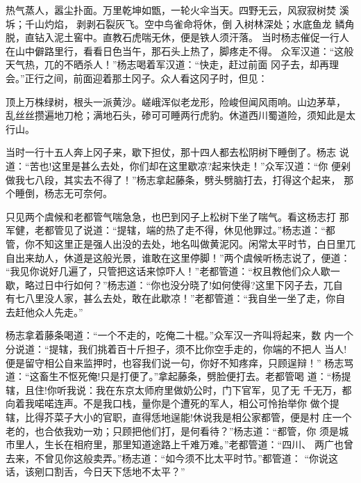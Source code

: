 热气蒸人，嚣尘扑面。万里乾坤如甑，一轮火伞当天。四野无云，风寂寂树焚
溪坼；千山灼焰，剥剥石裂灰飞。空中鸟雀命将休，倒入树林深处；水底鱼龙
鳞角脱，直钻入泥土窖中。直教石虎喘无休，便是铁人须汗落。
当时杨志催促一行人在山中僻路里行，看看日色当午，那石头上热了，脚疼走不得。
众军汉道：“这般天气热，兀的不晒杀人！”杨志喝着军汉道：“快走，赶过前面
冈子去，却再理会。”正行之间，前面迎着那土冈子。众人看这冈子时，但见：

顶上万株绿树，根头一派黄沙。嵯峨浑似老龙形，险峻但闻风雨响。山边茅草，
乱丝丝攒遍地刀枪；满地石头，碜可可睡两行虎豹。休道西川蜀道险，须知此是太
行山。

当时一行十五人奔上冈子来，歇下担仗，那十四人都去松阴树下睡倒了。杨志
说道：“苦也!这里是甚么去处，你们却在这里歇凉?起来快走！”众军汉道：“你
便剁做我七八段，其实去不得了！”杨志拿起藤条，劈头劈脑打去，打得这个起来，
那个睡倒，杨志无可奈何。

只见两个虞候和老都管气喘急急，也巴到冈子上松树下坐了喘气。看这杨志打
那军健，老都管见了说道：“提辖，端的热了走不得，休见他罪过。”杨志道：“都
管，你不知这里正是强人出没的去处，地名叫做黄泥冈。闲常太平时节，白日里兀
自出来劫人，休道是这般光景，谁敢在这里停脚！”两个虞候听杨志说了，便道：
“我见你说好几遍了，只管把这话来惊吓人！”老都管道：“权且教他们众人歇一
歇，略过日中行如何？”杨志道：“你也没分晓了!如何使得?这里下冈子去，兀自
有七八里没人家，甚么去处，敢在此歇凉！”老都管道：“我自坐一坐了走，你自
去赶他众人先走。”

杨志拿着藤条喝道：“一个不走的，吃俺二十棍。”众军汉一齐叫将起来，数
内一个分说道：“提辖，我们挑着百十斤担子，须不比你空手走的，你端的不把人
当人!便是留守相公自来监押时，也容我们说一句，你好不知疼痒，只顾逞辩！”
杨志骂道：“这畜生不怄死俺!只是打便了。”拿起藤条，劈脸便打去。老都管喝
道：“杨提辖，且住!你听我说：我在东京太师府里做奶公时，门下官军，见了无
千无万，都向着我喏喏连声。不是我口栈，量你是个遭死的军人，相公可怜抬举你
做个提辖，比得芥菜子大小的官职，直得恁地逞能!休说我是相公家都管，便是村
庄一个老的，也合依我劝一劝；只顾把他们打，是何看待？”杨志道：“都管，你
须是城市里人，生长在相府里，那里知道途路上千难万难。”老都管道：“四川、
两广也曾去来，不曾见你这般卖弄。”杨志道：“如今须不比太平时节。”都管道：
“你说这话，该剜口割舌，今日天下恁地不太平？”

